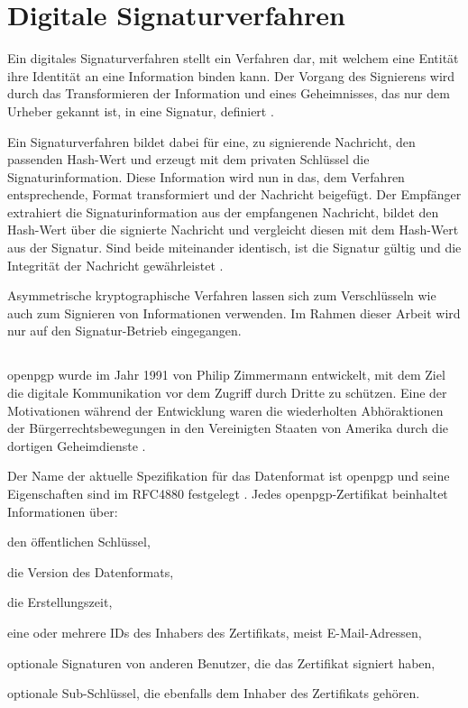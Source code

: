\section{Digitale Signaturverfahren}
\label{sec:GrundlagenDefinitionen:DigitaleSignaturen:Verfahren}
Ein digitales Signaturverfahren stellt ein Verfahren dar, mit welchem eine Entität ihre Identität an eine Information binden kann. Der Vorgang des Signierens
wird durch das Transformieren der Information und eines Geheimnisses, das nur dem Urheber gekannt ist, in eine Signatur, definiert \cite{hac}.

Ein Signaturverfahren bildet dabei für eine, zu signierende Nachricht, den passenden Hash-Wert und erzeugt mit dem privaten Schlüssel die Signaturinformation.
Diese Information wird nun in das, dem Verfahren entsprechende, Format transformiert und der Nachricht beigefügt.
Der Empfänger extrahiert die Signaturinformation aus der empfangenen Nachricht, bildet den Hash-Wert über die signierte Nachricht und vergleicht diesen mit dem
Hash-Wert aus der Signatur. Sind beide miteinander identisch, ist die Signatur gültig und die Integrität der Nachricht gewährleistet \cite{hac,singh:messages}.

Asymmetrische kryptographische Verfahren lassen sich zum Verschlüsseln wie auch zum Signieren von Informationen verwenden. Im Rahmen dieser Arbeit wird nur auf
den Signatur-Betrieb eingegangen.

\subsection{}
\label{sec:GrundlagenDefinitionen:DigitaleSignaturen:Verfahren:openpgp}
\gls{openpgp} wurde im Jahr 1991 von Philip Zimmermann \cite{zimmermann:pgp,pgp,intro-crypto} entwickelt, mit dem Ziel die digitale Kommunikation vor dem
Zugriff durch Dritte zu schützen. Eine der Motivationen während der Entwicklung waren die wiederholten Abhöraktionen der Bürgerrechtsbewegungen in den
Vereinigten Staaten von Amerika durch die dortigen Geheimdienste \cite{singh:messages}.

Der Name der aktuelle Spezifikation für das Datenformat ist \gls{openpgp} und seine Eigenschaften sind im RFC4880 festgelegt \cite{openpgp:ietf}. 
Jedes \gls{openpgp}-Zertifikat beinhaltet Informationen über:
\begin{itemize*}
    \item den öffentlichen Schlüssel,
    \item die Version des Datenformats,
    \item die Erstellungszeit,
    \item eine oder mehrere IDs des Inhabers des Zertifikats, meist E-Mail-Adressen,
    \item optionale Signaturen von anderen Benutzer, die das Zertifikat signiert haben,
    \item optionale Sub-Schlüssel, die ebenfalls dem Inhaber des Zertifikats gehören.
\end{itemize*}

